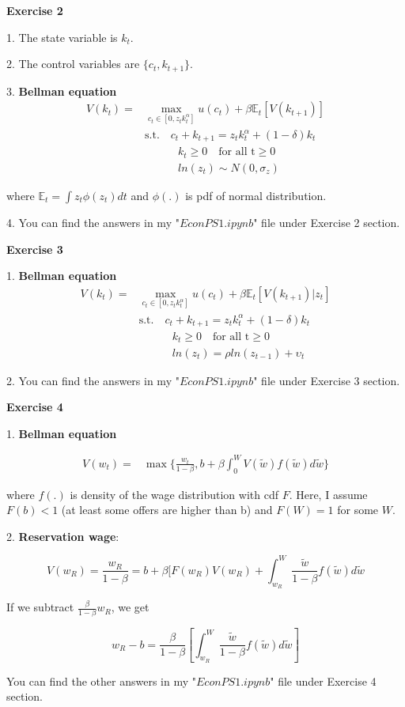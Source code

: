 \documentclass[12pt]{article}
\begin{document}
\textbf{Exercise 2}

1. The state variable is $k_t$.

2. The control variables are $\{c_t, k_{t+1}\}$.

3. \textbf{Bellman equation}
\begin{align*}
V(k_{t}) = & \max_{c_{t} \in [0,z_{t}k_{t}^{\alpha}]}  u(c_{t}) + \beta \mathbb{E}_{t} [V(k_{t+1})]  \\  & \text{s.t.} \quad  c_{t} + k_{t+1} = z_{t}k_{t}^{\alpha} + (1-\delta) k_{t} \\  & \quad \quad \quad k_{t} \geq 0 \quad \text{for all t}\geq 0 \\ & \quad \quad \quad ln(z_{t}) \sim N(0, \sigma_{z})
\end{align*}

where $ \mathbb{E}_{t} = \int z_{t} \phi (z_{t})dt$ and $\phi(.)$ is pdf of normal distribution. 

4. You can find the answers in my "$EconPS1.ipynb$" file under Exercise 2 section.

\textbf{Exercise 3}

1. \textbf{Bellman equation}
\begin{align*}
V(k_{t}) = & \max_{c_{t} \in [0,z_{t}k_{t}^{\alpha}]}  u(c_{t}) + \beta \mathbb{E}_{t} [V(k_{t+1})|z_{t}]   \\  & \text{s.t.} \quad  c_{t} + k_{t+1} = z_{t}k_{t}^{\alpha} + (1-\delta) k_{t} \\  & \quad \quad \quad k_{t} \geq 0 \quad \text{for all t}\geq 0 \\ & \quad \quad \quad ln(z_{t}) = \rho ln(z_{t-1}) + \upsilon_{t}
 \end{align*}

2. You can find the answers in my "$EconPS1.ipynb$" file under Exercise 3 section.


\textbf{Exercise 4}

1. \textbf{Bellman equation}

\begin{align*}
V(w_{t}) = & \max \{\frac{w_{t}}{1-\beta}, b + \beta \int_{0}^{W} V(\tilde{w})f(\tilde{w})d\tilde{w}\}  
 \end{align*}
 
 where $f(.)$ is density of the wage distribution with cdf $F$. Here, I assume $F(b) < 1$ (at least some offers are higher than b) and $F(W) = 1$ for some $W$. 

2. \textbf{Reservation wage}:

$$V(w_{R}) = \frac{w_{R}}{1-\beta} = b + \beta [F(w_{R})V(w_{R}) + \int_{w_{R}}^{W} \frac{\tilde{w}}{1-\beta}f(\tilde{w})d\tilde{w}$$

If we subtract $\frac{\beta}{1-\beta}w_{R}$, we get

$$w_{R} - b = \frac{\beta}{1-\beta} [\int_{w_{R}}^{W} \frac{\tilde{w}}{1-\beta}f(\tilde{w})d\tilde{w}]$$

You can find the other answers in my "$EconPS1.ipynb$" file under Exercise 4 section.
 
\end{document}

